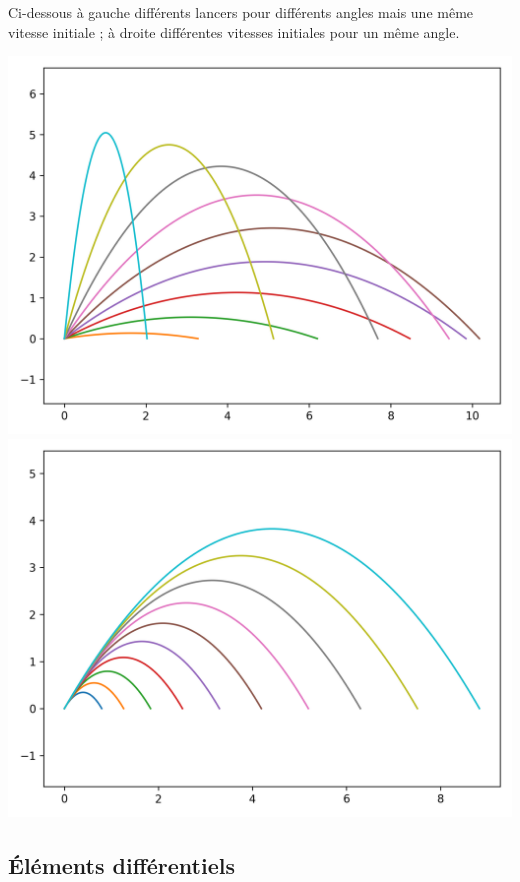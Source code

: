 \documentclass[11pt,class=report,crop=false]{standalone}
\begin{document}
Ci-dessous à gauche différents lancers pour différents angles mais une même vitesse initiale ; à droite différentes vitesses initiales pour un même angle.
\begin{center}
    \includegraphics[scale=\myscale,scale=0.4]{figures/balle2}\qquad
    \includegraphics[scale=\myscale,scale=0.4]{figures/balle3}   
\end{center}

\subsection{Éléments différentiels}
\end{document}

